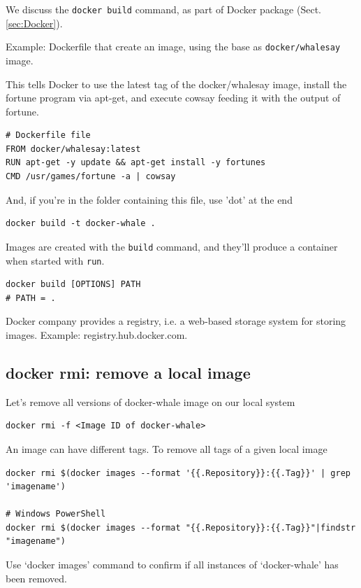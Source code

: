 We discuss the \verb!docker build! command, as part of Docker package (Sect.\ref{sec:Docker}).

Example: Dockerfile that create an image, using the base as \verb!docker/whalesay! image.

This tells Docker to use the latest tag of the docker/whalesay image, install
the fortune program via apt-get, and execute cowsay feeding it with the output
of fortune.

\begin{verbatim}
# Dockerfile file
FROM docker/whalesay:latest
RUN apt-get -y update && apt-get install -y fortunes
CMD /usr/games/fortune -a | cowsay
\end{verbatim}
And, if you're in the folder containing this file, use 'dot' at the end
\begin{verbatim}
docker build -t docker-whale .

\end{verbatim}

Images are created with the \verb!build! command, and they'll produce a container when
started with \verb!run!.
\begin{verbatim}
docker build [OPTIONS] PATH
# PATH = . 
\end{verbatim}

Docker company provides a registry, i.e. a web-based storage system for storing images.
Example: registry.hub.docker.com.


\subsection{docker rmi: remove a local image}
\label{sec:docker-rmi}

Let’s remove all versions of docker-whale image on our local system

\begin{verbatim}
docker rmi -f <Image ID of docker-whale>
\end{verbatim}

An image can have different tags. To remove all tags of a given local image
\begin{verbatim}
docker rmi $(docker images --format '{{.Repository}}:{{.Tag}}' | grep 'imagename')

# Windows PowerShell
docker rmi $(docker images --format "{{.Repository}}:{{.Tag}}"|findstr "imagename")
\end{verbatim}


Use ‘docker images’ command to confirm if all instances of ‘docker-whale’ has been removed.

